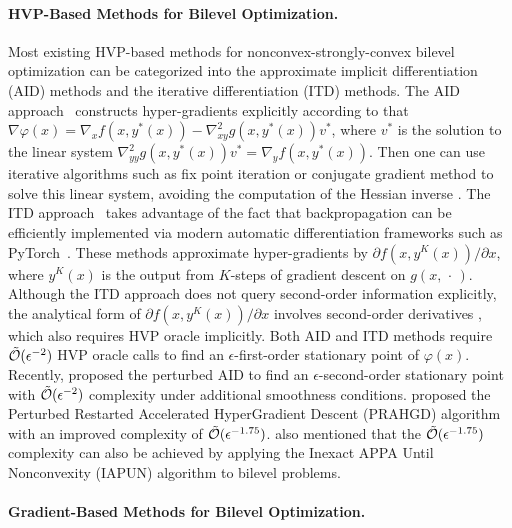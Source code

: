 \documentclass[twoside,11pt]{article}
\begin{document}
\paragraph{HVP-Based Methods for Bilevel Optimization.
} 

Most existing HVP-based methods for nonconvex-strongly-convex bilevel optimization can be categorized into
the approximate implicit differentiation (AID) methods  and the iterative differentiation
(ITD) methods. The AID approach~\citep{liao2018reviving,ji2021bilevel,ghadimi2018approximation,lorraine2020optimizing} constructs hyper-gradients explicitly according to  that $\nabla \varphi(x) = \nabla_x f(x,y^*(x)) - \nabla_{xy}^2 g(x,y^*(x)) v^*$, where $v^* $ is the solution to the linear system $\nabla_{yy}^2 g(x,y^*(x)) v^* =\nabla_y f(x,y^*(x)) $. Then one can use
iterative algorithms such as fix point iteration or conjugate gradient method to solve this linear system, avoiding the computation of the Hessian inverse \citep{grazzi2020iteration,ji2021bilevel,hong2023two}. 
The ITD approach~\citep{maclaurin2015gradient,shaban2019truncated,domke2012generic,franceschi2017forward,franceschi2018bilevel}  takes advantage of the fact that backpropagation can be efficiently implemented via modern
automatic differentiation frameworks such as PyTorch~\citep{paszke2019pytorch}. These methods approximate hyper-gradients by $\partial f(x,y^K(x)) / \partial x $, where $y^K(x)$ is the output from $K$-steps of gradient descent on $g(x,\,\cdot\,)$. Although the ITD approach does not query second-order information explicitly, the analytical form of $\partial f(x,y^K(x)) / \partial x $ involves second-order derivatives \citep{ji2021bilevel}, which also requires HVP oracle implicitly. Both AID and ITD methods require $\tilde {{\mathcal{O}}}(\epsilon^{-2})$ HVP oracle calls to find an $\epsilon$-first-order stationary point of $\varphi(x)$. Recently, \citet{huang2022efficiently} proposed the perturbed AID to find an $\epsilon$-second-order stationary point with $\tilde {{\mathcal{O}}}(\epsilon^{-2})$ complexity under additional smoothness conditions. \citet{yang2023accelerating} proposed the Perturbed Restarted Accelerated HyperGradient Descent (PRAHGD) algorithm with an improved complexity of $\tilde {{\mathcal{O}}}(\epsilon^{-1.75})$. \citet[Section 4.2]{wang2024efficient} also mentioned that the $\tilde {{\mathcal{O}}}(\epsilon^{-1.75})$ complexity can also be achieved by applying the Inexact APPA Until Nonconvexity (IAPUN) algorithm to bilevel problems. 

\paragraph{Gradient-Based Methods for Bilevel Optimization.}
\end{document}
